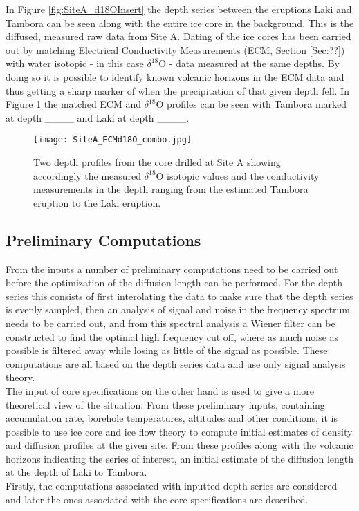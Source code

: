 \documentclass[../../CompleteThesis/Complete_1stDraft.tex]{subfiles}
\begin{document}
In Figure \ref{fig:SiteA_d18OInsert} the depth series between the eruptions Laki and Tambora can be seen along with the entire ice core in the background. This is the diffused, measured raw data from Site A. Dating of the ice cores has been carried out by matching Electrical Conductivity Measurements (ECM, Section \ref{Sec:??}) with water isotopic - in this case $\delta^{18}$O - data measured at the same depths. By doing so it is possible to identify known volcanic horizons in the ECM data and thus getting a sharp marker of when the precipitation of that given depth fell. In Figure \ref{fig:SiteA_ECMd18O_combo} the matched ECM and $\delta^{18}$O profiles can be seen with Tambora marked at depth \_\_\_\_ and Laki at depth \_\_\_\_.



\begin{figure}[h]
	\centering
	\texttt{[image: SiteA\_ECMd18O\_combo.jpg]}
	\caption[ECM and d18O data at LT, Site A.]{Two depth profiles from the core drilled at Site A showing accordingly the measured $\delta^{18}$O isotopic values and the conductivity measurements in the depth ranging from the estimated Tambora eruption to the Laki eruption.}	
	\label{fig:SiteA_ECMd18O_combo}
\end{figure}

\subsection[Preliminary Computations]{Preliminary Computations}
From the inputs a number of preliminary computations need to be carried out before the optimization of the diffusion length can be performed. For the depth series this consists of first interolating the data to make sure that the depth series is evenly sampled, then an analysis of signal and noise in the frequency spectrum needs to be carried out, and from this spectral analysis a Wiener filter can be constructed to find the optimal high frequency cut off, where as much noise as possible is filtered away while losing as little of the signal as possible. These computations are all based on the depth series data and use only signal analysis theory.\\
The input of core specifications on the other hand is used to give a more theoretical view of the situation. From these preliminary inputs, containing accumulation rate, borehole temperatures, altitudes and other conditions, it is possible to use ice core and ice flow theory to compute initial estimates of density and diffusion profiles at the given site. From these profiles along with the volcanic horizons indicating the series of interest, an initial estimate of the diffusion length at the depth of Laki to Tambora.\\
Firstly, the computations associated with inputted depth series are considered and later the ones associated with the core specifications are described. 
 
\end{document}
